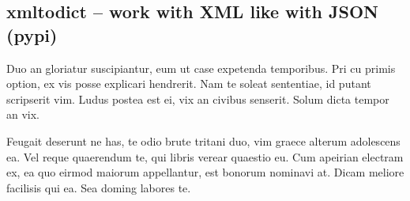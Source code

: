 \subsection{xmltodict -- work with XML like with JSON (pypi)}
Duo an gloriatur suscipiantur, eum ut case expetenda temporibus. Pri cu primis option, ex vis posse explicari hendrerit. Nam te soleat sententiae, id putant scripserit vim. Ludus postea est ei, vix an civibus senserit. Solum dicta tempor an vix.

Feugait deserunt ne has, te odio brute tritani duo, vim graece alterum adolescens ea. Vel reque quaerendum te, qui libris verear quaestio eu. Cum apeirian electram ex, ea quo eirmod maiorum appellantur, est bonorum nominavi at. Dicam meliore facilisis qui ea. Sea doming labores te.

